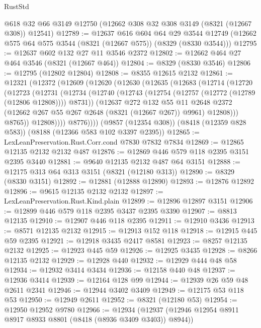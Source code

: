 \begin{lexlean}{RustStd}
\begin{coremodule}
    @618
    @32
    @66
    @3149
    @12750
    (@12662 @308 @32 @308 @3149 (@8321 (@12667 @308)) @12541)
@12789 := @12637
    @616
    @604
    @64
    @29
    @3544
    @12749
    (@12662 @575 @64 @575 @3544 (@8321 (@12667 @575)) (@8329 (@8330 @3544)))
@12795 := @12637 @602 @132 @27 @11 @3546 @2372
@12802 := @12662 @464 @27 @464 @3546 (@8321 (@12667 @464))
@12804 := @8329 (@8330 @3546)
@12806 := @12795 (@12802 @12804)
@12808 := @8355 @12615 @2132
@12861 := @12321
    (@12372
      (@12609
        (@12620
          (@12630
            (@12635
              (@12683
                (@12714
                  (@12720
                    (@12723
                      (@12731
                        (@12734
                          (@12740
                            (@12743 (@12754 (@12757 (@12772 (@12789 (@12806 @12808)))) @8731))
                            (@12637
                              @272
                              @132
                              @55
                              @11
                              @2648
                              @2372
                              (@12662 @267 @55 @267 @2648 (@8321 (@12667 @267)) @9961)
                              @12808)))
                        @8765))
                    @12808))))
            @8776))))
    (@9857 (@12354 @308))
    (@8418 (@12359 @828 @583))
    (@8188 (@12366 @583 @102 @3397 @2395))
@12865 := LexLeanPreservation.Rust.Corr.cond @7830 @7832 @7834
@12869 := @12865 @12135 @2132 @2132 @487
@12876 := @12869 @446 @579 @118 @2395 @3151 @2395 @3440
@12881 := @9640 @12135 @2132 @487 @64 @3151
@12888 := @12175 @313 @64 @313 @3151 (@8321 (@12180 @313))
@12890 := @8329 (@8330 @3151)
@12892 := @12881 (@12888 @12890)
@12893 := @12876 @12892
@12896 := @9615 @12135 @2132 @2132
@12897 := LexLeanPreservation.Rust.Kind.plain
@12899 := @12896 @12897 @3151
@12906 := @12899 @446 @579 @118 @2395 @3437 @2395 @3390
@12907 := @8813 @12135
@12910 := @12907 @446 @118 @2395
@12911 := @12910 @3436
@12913 := @8571 @12135 @2132
@12915 := @12913 @152 @118
@12918 := @12915 @445 @59 @2395
@12921 := @12918 @3435 @2417 @8581
@12923 := @8257 @12135 @2132
@12925 := @12923 @445 @59
@12926 := @12925 @3435
@12928 := @8266 @12135 @2132
@12929 := @12928 @440
@12932 := @12929 @444 @48 @58
@12934 := @12932 @3414 @3434
@12936 := @12158 @440 @48
@12937 := @12936 @3414
@12939 := @12164 @128 @99
@12944 := @12939 @26 @59 @48 @2611 @2341
@12946 := @12944 @3402 @3409
@12949 := @12175 @53 @118 @53
@12950 := @12949 @2611
@12952 := @8321 (@12180 @53)
@12954 := @12950 @12952 @9780
@12966 := @12934 (@12937 (@12946 @12954 @8911 @8917 @8933 @8801 (@8418 (@8936 @3409 @3403)) @8944))

\end{coremodule}
\end{lexlean}
